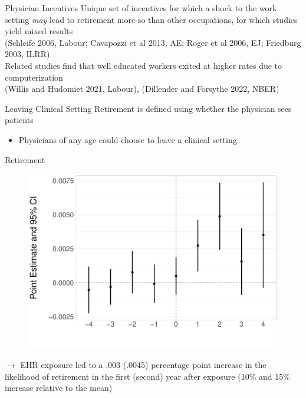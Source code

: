 \documentclass[10pt]{beamer}
\begin{document}
\begin{frame}{Physician Incentives}
Unique set of incentives for which a shock to the work setting \textit{may} lead to retirement more-so than other occupations, for which studies yield mixed results\\
\scriptsize{(Schleife 2006, Labour; Cavapozzi et al 2013, AE; Roger et al 2006, EJ; Friedburg 2003, ILRR)}\\
                \vspace{15mm}
                \normalsize
Related studies find that well educated workers exited at higher rates due to computerization\\
\scriptsize (Willis and Hudomiet 2021, Labour), (Dillender and Forsythe 2022, NBER)
\end{frame}

\begin{frame}{Leaving Clinical Setting}
Retirement is defined using whether the physician sees patients
                \vspace{3mm}
\begin{itemize}
    \item Physicians of any age could choose to leave a clinical setting
\end{itemize}
\end{frame}
\begin{frame}{Retirement}
\begin{figure}[ht]
    \centering
    \includegraphics[scale=.35]{Objects/Presentation_retire_all.pdf}
\end{figure}
$\rightarrow$ EHR exposure led to a .003 (.0045) percentage point increase in the likelihood of retirement in the first (second) year after exposure (10\% and 15\% increase relative to the mean)
\end{frame}
\end{document}
